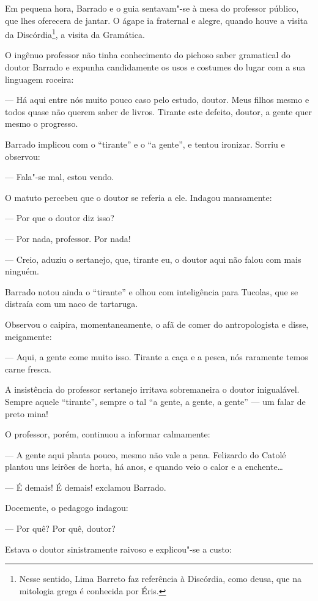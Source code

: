Em pequena hora, Barrado e o guia sentavam"-se à mesa do professor
público, que lhes oferecera de jantar. O ágape ia fraternal e alegre,
quando houve a visita da Discórdia\footnote{Nesse sentido, Lima Barreto
  faz referência à Discórdia, como deusa, que na mitologia grega é
  conhecida por Éris.}, a visita da Gramática.

O ingênuo professor não tinha conhecimento do pichoso saber gramatical
do doutor Barrado e expunha candidamente os usos e costumes do lugar com
a sua linguagem roceira:

--- Há aqui entre nós muito pouco caso pelo estudo, doutor. Meus filhos
mesmo e todos quase não querem saber de livros. Tirante este defeito,
doutor, a gente quer mesmo o progresso.

Barrado implicou com o ``tirante'' e o ``a gente'', e tentou ironizar.
Sorriu e observou:

--- Fala"-se mal, estou vendo.

O matuto percebeu que o doutor se referia a ele. Indagou mansamente:

--- Por que o doutor diz isso?

--- Por nada, professor. Por nada!

--- Creio, aduziu o sertanejo, que, tirante eu, o doutor aqui não falou
com mais ninguém.

Barrado notou ainda o ``tirante'' e olhou com inteligência para Tucolas,
que se distraía com um naco de tartaruga.

Observou o caipira, momentaneamente, o afã de comer do antropologista e
disse, meigamente:

--- Aqui, a gente come muito isso. Tirante a caça e a pesca, nós
raramente temos carne fresca.

A insistência do professor sertanejo irritava sobremaneira o doutor
inigualável. Sempre aquele ``tirante'', sempre o tal ``a gente, a gente,
a gente'' --- um falar de preto mina!

O professor, porém, continuou a informar calmamente:

--- A gente aqui planta pouco, mesmo não vale a pena. Felizardo do
Catolé plantou uns leirões de horta, há anos, e quando veio o calor e a
enchente\ldots{}

--- É demais! É demais! exclamou Barrado.

Docemente, o pedagogo indagou:

--- Por quê? Por quê, doutor?

Estava o doutor sinistramente raivoso e explicou"-se a custo:

